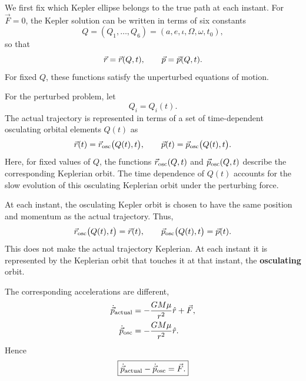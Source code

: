 	We first fix which Kepler ellipse belongs to the true path at each instant. For $\vec F=0$, the Kepler solution can be written in terms of six
	constants
	\begin{equation}
		Q=(Q_1,\ldots,Q_6)
		=
		(a,e,\iota,\Omega,\omega,t_0),
	\end{equation}
	so that
	\begin{equation}
		\vec r=\vec r(Q,t),
		\qquad
		\vec p=\vec p(Q,t).
		\label{eq:kepler_phase_solution}
	\end{equation}
	For fixed $Q$, these functions satisfy the unperturbed equations of
	motion.
	
	For the perturbed problem, let
	\begin{equation}
		Q_i=Q_i(t).
	\end{equation}
	The actual trajectory is represented in terms of a set of
	time-dependent osculating orbital elements \(Q(t)\) as
	\begin{equation}
		\vec r(t)
		=
		\vec r_{\rm osc}\bigl(Q(t),t\bigr),
		\qquad
		\vec p(t)
		=
		\vec p_{\rm osc}\bigl(Q(t),t\bigr).
		\label{eq:perturbed_parameterization}
	\end{equation}
	Here, for fixed values of \(Q\), the functions
	\(\vec r_{\rm osc}(Q,t)\) and \(\vec p_{\rm osc}(Q,t)\) describe the
	corresponding Keplerian orbit.  The time dependence of \(Q(t)\) accounts
	for the slow evolution of this osculating Keplerian orbit under the
	perturbing force.
	
	At each instant, the osculating Kepler orbit is chosen to have the same
	position and momentum as the actual trajectory.  Thus,
	\begin{equation}
		\vec r_{\rm osc}\bigl(Q(t),t\bigr)=\vec r(t),
		\qquad
		\vec p_{\rm osc}\bigl(Q(t),t\bigr)=\vec p(t).
		\label{eq:osculating_state}
	\end{equation}
	This does not make the actual trajectory Keplerian. At each instant it is represented by the Keplerian orbit that touches it at that instant, the \textbf{osculating} orbit.
	
	The corresponding accelerations are different,
	\begin{align}
		\dot{\vec p}_{\rm actual}
		&=
		-\frac{GM\mu}{r^2}\hat r+\vec F,
		\\
		\dot{\vec p}_{\rm osc}
		&=
		-\frac{GM\mu}{r^2}\hat r.
	\end{align}
	Hence
	\begin{equation}
		\boxed{
			\dot{\vec p}_{\rm actual}
			-
			\dot{\vec p}_{\rm osc}
			=
			\vec F .
		}
		\label{eq:perturbation_acceleration_difference}
	\end{equation}
	
